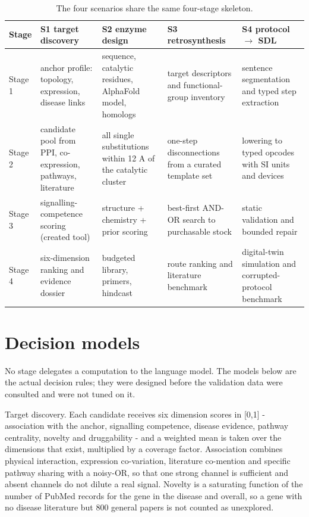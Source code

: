 \begin{table}[htbp]
\centering
\small
\caption{The four scenarios share the same four-stage skeleton.}
\begin{tabularx}{\textwidth}{l>{\raggedright\arraybackslash}X>{\raggedright\arraybackslash}X>{\raggedright\arraybackslash}X>{\raggedright\arraybackslash}X}
\hline
Stage & S1 target discovery & S2 enzyme design & S3 retrosynthesis & S4 protocol $\rightarrow$ SDL \\
\hline
Stage 1 & anchor profile: topology, expression, disease links & sequence, catalytic residues, AlphaFold model, homologs & target descriptors and functional-group inventory & sentence segmentation and typed step extraction \\
Stage 2 & candidate pool from PPI, co-expression, pathways, literature & all single substitutions within 12 A of the catalytic cluster & one-step disconnections from a curated template set & lowering to typed opcodes with SI units and devices \\
Stage 3 & signalling-competence scoring (created tool) & structure + chemistry + prior scoring & best-first AND-OR search to purchasable stock & static validation and bounded repair \\
Stage 4 & six-dimension ranking and evidence dossier & budgeted library, primers, hindcast & route ranking and literature benchmark & digital-twin simulation and corrupted-protocol benchmark \\
\hline
\end{tabularx}

\end{table}

\section{Decision models}

No stage delegates a computation to the language model. The models below are the actual decision rules; they were designed before the validation data were consulted and were not tuned on it.

Target discovery. Each candidate receives six dimension scores in [0,1] - association with the anchor, signalling competence, disease evidence, pathway centrality, novelty and druggability - and a weighted mean is taken over the dimensions that exist, multiplied by a coverage factor. Association combines physical interaction, expression co-variation, literature co-mention and specific pathway sharing with a noisy-OR, so that one strong channel is sufficient and absent channels do not dilute a real signal. Novelty is a saturating function of the number of PubMed records for the gene in the disease and overall, so a gene with no disease literature but 800 general papers is not counted as unexplored.

